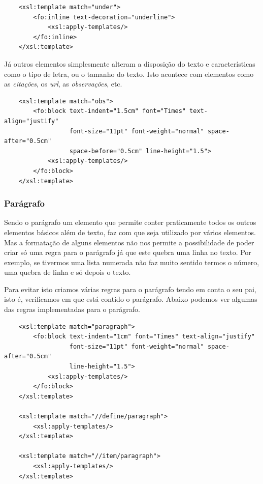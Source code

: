 \documentclass[a4paper]{article}
\begin{document}
\begin{small}
\begin{lstlisting}
    <xsl:template match="under">
        <fo:inline text-decoration="underline">
            <xsl:apply-templates/>
        </fo:inline>
    </xsl:template>
\end{lstlisting}
\end{small}

\hspace{1cm}Já outros elementos simplesmente alteram a disposição do texto e características como o tipo de letra, ou o tamanho do texto. Isto acontece com elementos como as {\em citações}, os {\em url}, as {\em observações}, etc.\\

\begin{small}
\begin{lstlisting}
    <xsl:template match="obs">
        <fo:block text-indent="1.5cm" font="Times" text-align="justify"
                  font-size="11pt" font-weight="normal" space-after="0.5cm"
                  space-before="0.5cm" line-height="1.5">
            <xsl:apply-templates/>
        </fo:block>
    </xsl:template>
\end{lstlisting}
\end{small}

\subsubsection{Parágrafo}

\hspace{1cm}Sendo o parágrafo um elemento que permite conter praticamente todos os outros elementos básicos além de texto, faz com que seja utilizado por vários elementos. Mas a formatação de alguns elementos não nos permite a possibilidade de poder criar só uma regra para o parágrafo já que este quebra uma linha no texto. Por exemplo, se tivermos uma lista numerada não faz muito sentido termos o número, uma quebra de linha e só depois o texto.

\hspace{1cm}Para evitar isto criamos várias regras para o parágrafo tendo em conta o seu pai, isto é, verificamos em que está contido o parágrafo. Abaixo podemos ver algumas das regras implementadas para o parágrafo.\\

\begin{small}
\begin{lstlisting}
    <xsl:template match="paragraph">
        <fo:block text-indent="1cm" font="Times" text-align="justify"
                  font-size="11pt" font-weight="normal" space-after="0.5cm"
                  line-height="1.5">
            <xsl:apply-templates/>
        </fo:block>
    </xsl:template>

    <xsl:template match="//define/paragraph">
        <xsl:apply-templates/>
    </xsl:template>

    <xsl:template match="//item/paragraph">
        <xsl:apply-templates/>
    </xsl:template>
\end{lstlisting}
\end{small}
\end{document}
